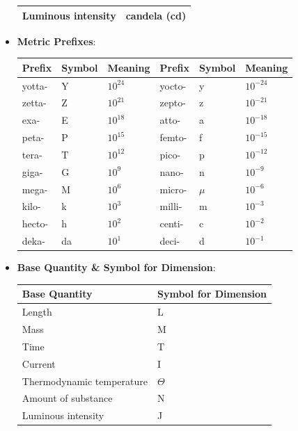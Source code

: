 \documentclass{report}
\begin{document}
\begin{itemize}
\begin{tabularx}{\textwidth}{|X|X|}
                Luminous intensity & candela (cd) \\
                \hline
            \end{tabularx}
            \pagebreak 
        \item \textbf{Metric Prefixes}:
            \begin{center}
                \begin{tabularx}{\textwidth}{|X|X|X|X|X|X|}
                    \hline
                    Prefix & Symbol & Meaning & Prefix & Symbol & Meaning \\ 
                    \hline
                    yotta- & Y & $10^{24}$ & yocto- & y & $10^{-24}$ \\
                    zetta- & Z & $10^{21}$ & zepto- & z & $10^{-21}$ \\
                    exa-   & E & $10^{18}$ & atto-  & a & $10^{-18}$ \\
                    peta-  & P & $10^{15}$ & femto- & f & $10^{-15}$ \\
                    tera-  & T & $10^{12}$ & pico-  & p & $10^{-12}$ \\
                    giga-  & G & $10^9$   & nano-  & n & $10^{-9}$  \\
                    mega-  & M & $10^6$   & micro- & $\mu$ & $10^{-6}$ \\
                    kilo-  & k & $10^3$   & milli- & m & $10^{-3}$ \\
                    hecto- & h & $10^2$   & centi- & c & $10^{-2}$ \\
                    deka-  & da & $10^1$  & deci-  & d & $10^{-1}$ \\
                    \hline
                \end{tabularx}
            \end{center}
            \bigbreak \noindent 
        \item \textbf{Base Quantity \& Symbol for Dimension}:
            \begin{center}
                \begin{tabularx}{\textwidth}{|X|X|}
                    \hline
                    Base Quantity & Symbol for Dimension \\
                    \hline
                    Length & L \\
                    Mass & M \\
                    Time & T \\
                    Current & I \\
                    Thermodynamic temperature & $\Theta$ \\
                    Amount of substance & N \\
                    Luminous intensity & J \\
                    \hline
                \end{tabularx}
            \end{center}
    \end{itemize}
\end{document}
